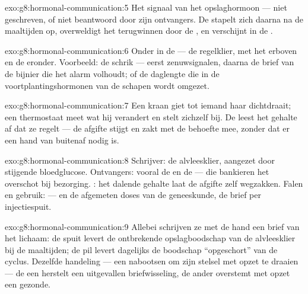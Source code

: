 \begin{solution}{exo:g8:hormonal-communication:5}
Het signaal van het opslaghormoon --- niet geschreven, of niet beantwoord
door zijn ontvangers. De  stapelt zich daarna na de maaltijden op,
overweldigt het terugwinnen door de , en verschijnt in de .
\end{solution}

\begin{solution}{exo:g8:hormonal-communication:6}
Onder in de  --- de regelklier, met het  erboven en de
 eronder. Voorbeeld: de schrik --- eerst zenuwsignalen, daarna de
brief van de bijnier die het alarm volhoudt; of de daglengte die in de
voortplantingshormonen van de schapen wordt omgezet.
\end{solution}

\begin{solution}{exo:g8:hormonal-communication:7}
Een kraan giet tot iemand haar dichtdraait; een thermostaat meet wat hij
verandert en stelt zichzelf bij. De  leest het gehalte af dat ze
regelt --- de afgifte stijgt en zakt met de behoefte mee, zonder dat er een
hand van buitenaf nodig is.
\end{solution}

\begin{solution}{exo:g8:hormonal-communication:8}
Schrijver: de alvleesklier, aangezet door stijgende bloedglucose.
Ontvangers: vooral de  en de  --- die bankieren het overschot
bij bezorging. : het dalende gehalte laat de afgifte zelf
wegzakken. Falen en gebruik:  --- en de afgemeten doses van de
geneeskunde, de brief per injectiespuit.
\end{solution}

\begin{solution}{exo:g8:hormonal-communication:9}
Allebei schrijven ze met de hand een brief van het lichaam: de spuit
levert de ontbrekende opslagboodschap van de alvleesklier bij de
maaltijden; de pil levert dagelijks de boodschap ``opgeschort'' van de
cyclus. Dezelfde handeling --- een  nabootsen om zijn stelsel met
opzet te draaien --- de een herstelt een uitgevallen briefwisseling, de
ander overstemt met opzet een gezonde.
\end{solution}

